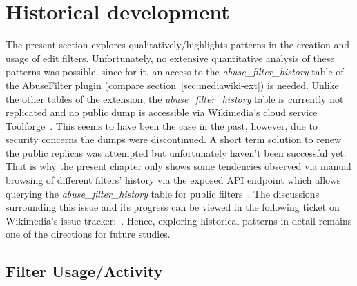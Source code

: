 \section{Historical development}
\label{sec:5-history}

The present section explores qualitatively/highlights patterns in the creation and usage of edit filters.
Unfortunately, no extensive quantitative analysis of these patterns was possible, since for it, an access to the \emph{abuse\_filter\_history} table of the AbuseFilter plugin (compare section~\ref{sec:mediawiki-ext}) is needed.
Unlike the other tables of the extension, the \emph{abuse\_filter\_history} table is currently not replicated and no public dump is accessible via Wikimedia's cloud service Toolforge~\cite{Wikimedia:Toolforge}.
This seems to have been the case in the past, however, due to security concerns the dumps were discontinued.
A short term solution to renew the public replicas was attempted but unfortunately haven't been successful yet.
That is why the present chapter only shows some tendencies observed via manual browsing of different filters' history via the exposed API endpoint which allows querying the \emph{abuse\_filter\_history} table for public filters~\cite{Wikipedia:AbuseFilterHistory}.
The discussions surrounding this issue and its progress can be viewed in the following ticket on Wikimedia's issue tracker:~\cite{phabricator}.
Hence, exploring historical patterns in detail remains one of the directions for future studies.

\subsection{Filter Usage/Activity}

